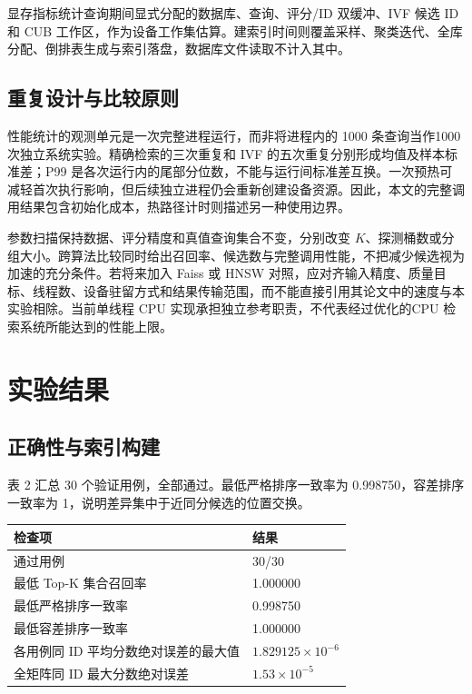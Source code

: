 \documentclass[UTF8,a4paper,zihao=5,fontset=none]{ctexart}
\begin{document}
显存指标统计查询期间显式分配的数据库、查询、评分/ID 双缓冲、IVF 候选 ID和 CUB 工作区，作为设备工作集估算。建索引时间则覆盖采样、聚类迭代、全库分配、倒排表生成与索引落盘，数据库文件读取不计入其中。


\subsection{重复设计与比较原则}

性能统计的观测单元是一次完整进程运行，而非将进程内的 1000 条查询当作1000 次独立系统实验。精确检索的三次重复和 IVF 的五次重复分别形成均值及样本标准差；P99 是各次运行内的尾部分位数，不能与运行间标准差互换。一次预热可减轻首次执行影响，但后续独立进程仍会重新创建设备资源。因此，本文的完整调用结果包含初始化成本，热路径计时则描述另一种使用边界。


参数扫描保持数据、评分精度和真值查询集合不变，分别改变 $K$、探测桶数或分组大小。跨算法比较同时给出召回率、候选数与完整调用性能，不把减少候选视为加速的充分条件。若将来加入 Faiss 或 HNSW 对照，应对齐输入精度、质量目标、线程数、设备驻留方式和结果传输范围，而不能直接引用其论文中的速度与本实验相除。当前单线程 CPU 实现承担独立参考职责，不代表经过优化的CPU 检索系统所能达到的性能上限。


\section{实验结果}

\subsection{正确性与索引构建}

表 2 汇总 30 个验证用例，全部通过。最低严格排序一致率为 0.998750，容差排序一致率为 1，说明差异集中于近同分候选的位置交换。


\par\medskip\noindent\begin{minipage}{\linewidth}
\small
{}\label{tab:2}
\begin{tabular}{@{}P{101.881mm}R{57.308mm}@{}}
\toprule
\textbf{检查项} & \textbf{结果} \\
\midrule
通过用例 & 30/30 \\
最低 Top-K 集合召回率 & 1.000000 \\
最低严格排序一致率 & 0.998750 \\
最低容差排序一致率 & 1.000000 \\
各用例同 ID 平均分数绝对误差的最大值 & $1.829125\times10^{-6}$ \\
全矩阵同 ID 最大分数绝对误差 & $1.53\times10^{-5}$ \\
\bottomrule
\end{tabular}
\end{minipage}\par\medskip
\end{document}
